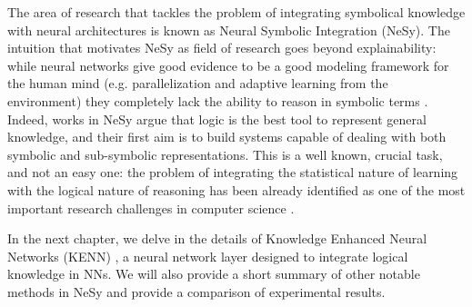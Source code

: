 The area of research that tackles the problem of integrating symbolical knowledge with neural architectures is known as Neural Symbolic Integration (NeSy). The intuition that motivates NeSy as field of research goes beyond explainability: while neural networks give good evidence to be a good modeling framework for the human mind (e.g. parallelization and adaptive learning from the environment) they completely lack the ability to reason in symbolic terms \cite{Besold2017NeuralSymbolicLA}. Indeed, works in NeSy argue that logic is the best tool to represent general knowledge, and their first aim is to build systems capable of dealing with both symbolic and sub-symbolic representations.
This is a well known, crucial task, and not an easy one: the problem of integrating the statistical nature of learning with the logical nature of reasoning has been already identified as one of the most important research challenges in computer science \cite{valiant2003threeproblems}.

In the next chapter, we delve in the details of Knowledge Enhanced Neural Networks (KENN) \cite{daniele2019kenn}, a neural network layer designed to integrate logical knowledge in NNs. We will also provide a short summary of other notable methods in NeSy and provide a comparison of experimental results.




